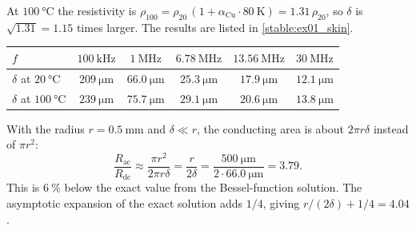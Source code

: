 \begin{solutionblock}
	At $\SI{100}{\celsius}$ the resistivity is $\rho_{100}=\rho_{20}\,(1+\alpha_\mathrm{Cu}\cdot\SI{80}{\kelvin})=1.31\,\rho_{20}$, so $\delta$ is $\sqrt{1.31}=1.15$ times larger. The results are listed in \autoref{stable:ex01_skin}.
	\begin{solutiontable}[ht]
		\centering
		\begin{tabular}{lccccc}
			\toprule
			$f$                               & $\SI{100}{\kilo\hertz}$ & $\SI{1}{\mega\hertz}$ & $\SI{6.78}{\mega\hertz}$ & $\SI{13.56}{\mega\hertz}$ & $\SI{30}{\mega\hertz}$ \\
			\midrule
			$\delta$ at $\SI{20}{\celsius}$   & $\SI{209}{\micro\meter}$ & $\SI{66.0}{\micro\meter}$ & $\SI{25.3}{\micro\meter}$ & $\SI{17.9}{\micro\meter}$ & $\SI{12.1}{\micro\meter}$ \\
			$\delta$ at $\SI{100}{\celsius}$  & $\SI{239}{\micro\meter}$ & $\SI{75.7}{\micro\meter}$ & $\SI{29.1}{\micro\meter}$ & $\SI{20.6}{\micro\meter}$ & $\SI{13.8}{\micro\meter}$ \\
			\bottomrule
		\end{tabular}
		\caption{Skin depth of copper.}
		\label{stable:ex01_skin}
	\end{solutiontable}
\end{solutionblock}


\begin{solutionblock}
	With the radius $r=\SI{0.5}{\milli\meter}$ and $\delta\ll r$, the conducting area is about $2\pi r\delta$ instead of $\pi r^2$:
	\begin{equation}
		\frac{R_\mathrm{ac}}{R_\mathrm{dc}} \approx \frac{\pi r^2}{2\pi r\delta} = \frac{r}{2\delta} = \frac{\SI{500}{\micro\meter}}{2\cdot\SI{66.0}{\micro\meter}} = 3.79.
	\end{equation}
	This is $\SI{6}{\percent}$ below the exact value from the Bessel-function solution. The asymptotic expansion of the exact solution adds $1/4$, giving $r/(2\delta)+1/4=4.04$.
\end{solutionblock}


